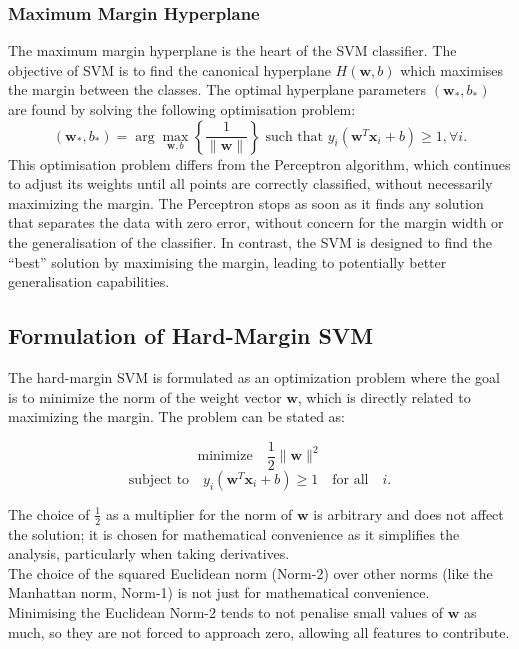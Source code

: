 \subsubsection*{Maximum Margin Hyperplane}
The maximum margin hyperplane is the heart of the SVM classifier. The objective of SVM is to find the canonical hyperplane \( H(\mathbf{w}, b) \) which maximises the margin between the classes. The optimal hyperplane parameters \( (\mathbf{w}_*, b_*) \) are found by solving the following optimisation problem:
\[
(\mathbf{w}_*, b_*) = \arg\max_{\mathbf{w},b} \left\{ \frac{1}{\|\mathbf{w}\|} \right\} \text{ such that } y_i(\mathbf{w}^T \mathbf{x}_i + b) \geq 1, \forall i.
\]
This optimisation problem differs from the Perceptron algorithm, which continues to adjust its weights until all points are correctly classified, without necessarily maximizing the margin. The Perceptron stops as soon as it finds any solution that separates the data with zero error, without concern for the margin width or the generalisation of the classifier. In contrast, the SVM is designed to find the ``best'' solution by maximising the margin, leading to potentially better generalisation capabilities.

\subsection{Formulation of Hard-Margin SVM}
\label{subsec:formulation_hard_margin_svm}

The hard-margin SVM is formulated as an optimization problem where the goal is to minimize the norm of the weight vector \( \mathbf{w} \), which is directly related to maximizing the margin. The problem can be stated as:

\[
\text{minimize} \quad \frac{1}{2}\|\mathbf{w}\|^2
\]
\[
\text{subject to} \quad y_i(\mathbf{w}^T \mathbf{x}_i + b) \geq 1 \quad \text{for all} \quad i.
\]

The choice of \( \frac{1}{2} \) as a multiplier for the norm of \( \mathbf{w} \) is arbitrary and does not affect the solution; it is chosen for mathematical convenience as it simplifies the analysis, particularly when taking derivatives.\\

The choice of the squared Euclidean norm (Norm-2) over other norms (like the Manhattan norm, Norm-1) is not just for mathematical convenience.\\

Minimising the Euclidean Norm-2 tends to not penalise small values of \( \mathbf{w} \) as much, so they are not forced to approach zero, allowing all features to contribute.\\



